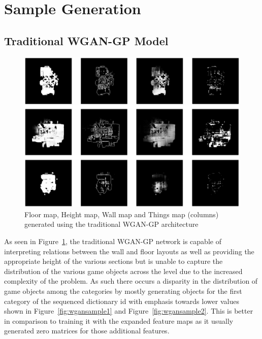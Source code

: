 \documentclass{Configuration_Files/PoliMi3i_thesis}
\begin{document}
\section{Sample Generation}
\subsection{Traditional WGAN-GP Model}
\begin{figure}[H]
    \centering
    \includegraphics[width=1\textwidth]{wgan_sample.jpg}
    \caption[Samples generated using the traditional WGAN-GP architecture]{Floor map, Height map, Wall map and Things map (columns) generated using the traditional WGAN-GP architecture}
    \label{fig:wgansample}
\end{figure}
As seen in Figure~\ref{fig:wgansample}, the traditional WGAN-GP network  is capable of interpreting 
relations between the wall and floor layouts as well as providing the appropriate height of the 
various sections but is unable to capture the distribution of the various game objects 
across the level due to the increased complexity of the problem. As such there occurs 
a disparity in the distribution of game objects among the categories by mostly 
generating objects for the first category of the sequenced dictionary id with emphasis 
towards lower values shown in Figure~\ref{fig:wgansample1} and Figure~\ref{fig:wgansample2}. 
This is better in comparison to training it with the expanded feature maps as it usually generated zero 
matrices for those additional features.
\end{document}
